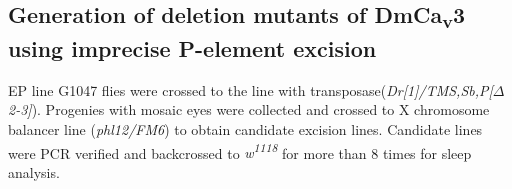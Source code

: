 \subsection*{Generation of deletion mutants of DmCa\textsubscript{v}3 using imprecise P-element excision}

EP line G1047 flies were crossed to the line with transposase(\emph{Dr[1]/TMS,Sb,P[$\Delta$2-3]}). Progenies with mosaic eyes were collected and crossed to X chromosome balancer line (\emph{phl12/FM6}) to obtain candidate excision lines. Candidate lines were PCR verified and backcrossed to \emph{w\textsuperscript{1118}} for more than 8 times for sleep analysis.

  
  
  
  